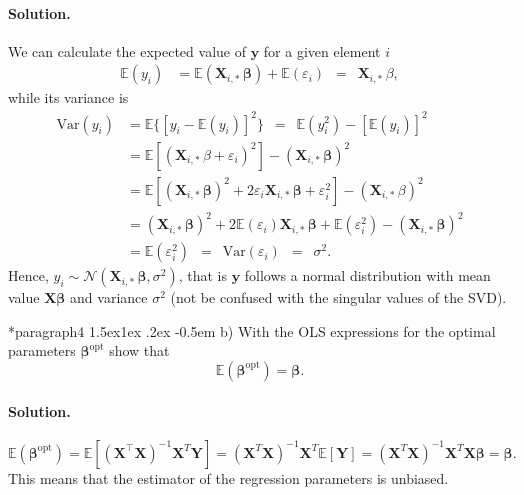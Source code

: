\documentclass[%
oneside,                 %
final,                   %
10pt]{article}
\makeatletter
\newenvironment{doconceexercise}{}{}
\newcommand\subex{\@startsection*{paragraph}{4}{\z@}%
                  {1.5ex\@plus1ex \@minus.2ex}%
                  {-0.5em}%
                  {\normalfont\normalsize\bfseries}}
\makeatother
\begin{document}
\begin{doconceexercise}
\paragraph{Solution.}
We can calculate the expected value of $\bm{y}$ for a given element $i$ 
\begin{align*} 
\mathbb{E}(y_i) & =
\mathbb{E}(\mathbf{X}_{i, \ast} \, \bm{\beta}) + \mathbb{E}(\varepsilon_i)
\, \, \, = \, \, \, \mathbf{X}_{i, \ast} \, \beta, 
\end{align*} 
while
its variance is 
\begin{align*} \mbox{Var}(y_i) & = \mathbb{E} \{ [y_i
- \mathbb{E}(y_i)]^2 \} \, \, \, = \, \, \, \mathbb{E} ( y_i^2 ) -
[\mathbb{E}(y_i)]^2  \\  & = \mathbb{E} [ ( \mathbf{X}_{i, \ast} \,
\beta + \varepsilon_i )^2] - ( \mathbf{X}_{i, \ast} \, \bm{\beta})^2 \\ &
= \mathbb{E} [ ( \mathbf{X}_{i, \ast} \, \bm{\beta})^2 + 2 \varepsilon_i
\mathbf{X}_{i, \ast} \, \bm{\beta} + \varepsilon_i^2 ] - ( \mathbf{X}_{i,
\ast} \, \beta)^2 \\  & = ( \mathbf{X}_{i, \ast} \, \bm{\beta})^2 + 2
\mathbb{E}(\varepsilon_i) \mathbf{X}_{i, \ast} \, \bm{\beta} +
\mathbb{E}(\varepsilon_i^2 ) - ( \mathbf{X}_{i, \ast} \, \bm{\beta})^2 
\\ & = \mathbb{E}(\varepsilon_i^2 ) \, \, \, = \, \, \,
\mbox{Var}(\varepsilon_i) \, \, \, = \, \, \, \sigma^2.  
\end{align*}
Hence, $y_i \sim \mathcal{N}( \mathbf{X}_{i, \ast} \, \bm{\beta}, \sigma^2)$, that is $\bm{y}$ follows a normal distribution with 
mean value $\bm{X}\bm{\beta}$ and variance $\sigma^2$ (not be confused with the singular values of the SVD).


\subex{b)}
With the OLS expressions for the optimal parameters $\bm{\beta}^{\mathrm{opt}}$ show that
\[
\mathbb{E}(\bm{\beta}^{\mathrm{opt}}) = \bm{\beta}.
\]

\paragraph{Solution.}
\[
\mathbb{E}(\bm{\beta}^{\mathrm{opt}}) = \mathbb{E}[ (\mathbf{X}^{\top} \mathbf{X})^{-1}\mathbf{X}^{T} \mathbf{Y}]=(\mathbf{X}^{T} \mathbf{X})^{-1}\mathbf{X}^{T} \mathbb{E}[ \mathbf{Y}]=(\mathbf{X}^{T} \mathbf{X})^{-1} \mathbf{X}^{T}\mathbf{X}\bm{\beta}=\bm{\beta}.
\]
This means that the estimator of the regression parameters is unbiased.


\end{doconceexercise}
\end{document}
